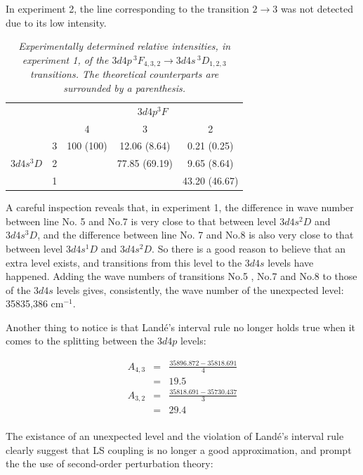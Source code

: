 \documentclass[a4paper]{article}
\begin{document}
In experiment 2, the line corresponding to the transition $2 \to 3$ was not detected due to its low intensity.

\begin{table}[htb!]
\centering
\begin{tabular}{cc|c|c|c|}
\cline{3-5}
& & \multicolumn{3}{c|}{$3d4p ^3F$}\\
\cline{3-5}
& & 4 & 3 & 2\\
\hline
\multicolumn{1}{|c|}{\multirow{3}{*}{$3d4s ^3D$}} & 3 & 100 (100) &
12.06 (8.64) & 0.21 (0.25) \\
\multicolumn{1}{|c|}{} & 2 & & 77.85 (69.19) & 9.65 (8.64)\\
\multicolumn{1}{|c|}{} & 1 & & & 43.20 (46.67) \\
\hline
\end{tabular}
\caption{\it Experimentally determined relative intensities, in experiment 1, of the
  $3d4p\,^3F_{4,3,2} \to 3d4s\,^3D_{1,2,3}$ transitions. The
  theoretical counterparts are surrounded by a parenthesis.}
\label{tab:exp-intensity21}
\end{table}

A careful inspection reveals that, in experiment 1, the difference in wave number between line No. 5 and No.7 is very close to that between level $3d4s ^{2}D$ and $3d4s ^{3}D$, and the difference between line No. 7 and No.8 is also very close to that between level $3d4s ^{1}D$ and $3d4s ^{2}D$. So there is a good reason to believe that an extra level exists, and transitions from this level to the $3d4s$ levels have happened. Adding the wave numbers of transitions No.5 , No.7 and No.8 to those of the $3d4s$ levels gives, consistently, the wave number of the unexpected level: 35835,386 cm$^{-1}$.

Another thing to notice is that Land\'e's interval rule no longer holds true when it comes to the splitting between the $3d4p$ levels:

\begin{eqnarray*}
A_{4,3} &=& \frac{35896.872 - 35818.691}{4} \\
&=& 19.5 \\
A_{3,2} &=& \frac{35818.691 - 35730.437}{3} \\
&=& 29.4 \\
\end{eqnarray*}

The existance of an unexpected level and the violation of Land\'e's interval rule clearly suggest that LS coupling is no longer a good approximation, and prompt the the use of second-order perturbation theory:
\end{document}
